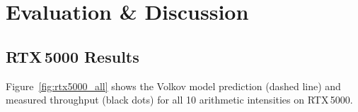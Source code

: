 
\section{Evaluation \& Discussion}
\label{sec:evaluation}


\subsection{RTX\,5000 Results}
\label{subsec:rtx5000_results}

Figure~\ref{fig:rtx5000_all} shows the Volkov model prediction (dashed line)
and measured throughput (black dots) for all 10 arithmetic intensities on
RTX\,5000.

